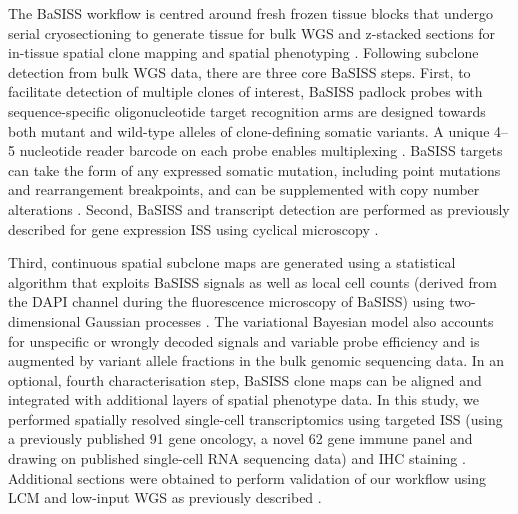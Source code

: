 The \ac{BaSISS} workflow is centred around fresh frozen tissue blocks that undergo serial cryosectioning to generate tissue for bulk \ac{WGS} and z-stacked sections for in-tissue spatial clone mapping and spatial phenotyping . Following subclone detection from bulk \ac{WGS} data, there are three core \ac{BaSISS} steps. First, to facilitate detection of multiple clones of interest, \ac{BaSISS} padlock probes with sequence-specific oligonucleotide target recognition arms are designed towards both mutant and wild-type alleles of clone-defining somatic variants. A unique 4–5 nucleotide reader barcode on each probe enables multiplexing \parencite{Ke2013-ux}. \ac{BaSISS} targets can take the form of any expressed somatic mutation, including point mutations and rearrangement breakpoints, and can be supplemented with copy number alterations . Second, \ac{BaSISS} and transcript detection are performed as previously described for gene expression \ac{ISS} using cyclical microscopy \parencite{Ke2013-ux,Svedlund2019-xb} .

Third, continuous spatial subclone maps are generated using a statistical algorithm that exploits \ac{BaSISS} signals as well as local cell counts (derived from the DAPI channel during the fluorescence microscopy of \ac{BaSISS}) using two-dimensional Gaussian processes . The variational Bayesian model also accounts for unspecific or wrongly decoded signals and variable probe efficiency and is augmented by variant allele fractions in the bulk genomic sequencing data. In an optional, fourth characterisation step, \ac{BaSISS} clone maps can be aligned and integrated with additional layers of spatial phenotype data. In this study, we performed spatially resolved single-cell transcriptomics using targeted \ac{ISS} (using a previously published 91 gene oncology, a novel 62 gene immune panel and drawing on published single-cell RNA sequencing data) \parencite{Svedlund2019-xb,Wu2021-uq} and \acf{IHC} staining . Additional sections were obtained to perform validation of our workflow using \ac{LCM} and low-input \ac{WGS} as previously described \parencite{Ellis2021-du} .

